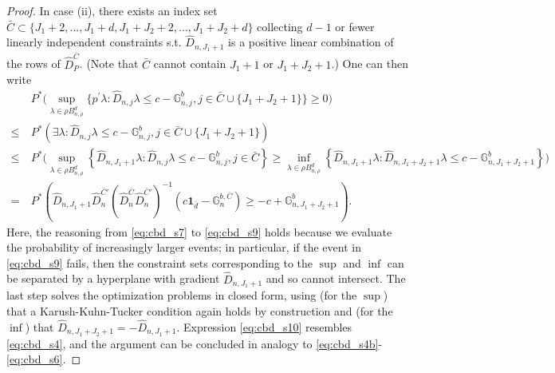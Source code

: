 \documentclass[letterpaper,11pt]{article}
\theoremstyle{myplain}
\theoremstyle{mydefinition}
\theoremstyle{myremark}
\newcommand{\G}{\mathbb{G}}
\numberwithin{equation}{section}
\numberwithin{figure}{section}
\begin{document}
\begin{appendices}
\begin{proof}
In case (ii), there exists an index set $\bar C \subset \{J_1+2,...,J_1+d,J_1+J_2+2,...,J_1+J_2+d\}$ collecting $d-1$ or fewer linearly independent constraints s.t. $\hat{D}_{n,J_1+1}$ is a positive linear combination of the rows of $\hat{D}_{P}^{\bar C}$. (Note that $\bar C$ cannot contain $J_1+1$ or $J_1+J_2+1$.) One can then write
\begin{align}
&~P^* \Big( \sup_{\lambda \in \rho B^d_{n,\rho}} \Big\{ p^{\prime }\lambda:\hat{D}_{n,j}\lambda \leq c-\G_{n,j}^b,j \in \bar C \cup \{J_1+J_2+1\} \Big\} \geq 0 \Big) \label{eq:cbd_s7}\\
\leq &~P^* \left( \exists \lambda: \hat{D}_{n,j}\lambda \leq c-\G_{n,j}^b,j \in \bar C \cup \{J_1+J_2+1\} \right) \label{eq:cbd_s8}\\
\leq &~P^* \Big(\sup_{\lambda \in \rho B^d_{n,\rho}} \left\{ \hat{D}_{n,J_1+1}\lambda: \hat{D}_{n,j}\lambda \leq c-\G_{n,j}^b,j \in \bar C \right\} \geq \inf_{\lambda \in \rho B^d_{n,\rho}} \left\{ \hat{D}_{n,J_1+1}\lambda: \hat{D}_{n,J_1+J_2+1}\lambda \leq c-\G_{n,J_1+J_2+1}^b\right\} \Big)\label{eq:cbd_s9} \\
= &~P^* \left( \hat{D}_{n,J_1+1} \hat{D}^{\bar C \prime}_{n} (\hat{D}^{\bar C}_{n} \hat{D}^{\bar C \prime}_{n})^{-1} (c\mathbf{1}_{\bar d}-\G^{b,\bar C}_n) \geq -c+\G_{n,J_1+J_2+1}^b \right). \label{eq:cbd_s10} 
\end{align}
Here, the reasoning from \eqref{eq:cbd_s7} to \eqref{eq:cbd_s9} holds because we evaluate the probability of increasingly larger events; in particular, if the event in \eqref{eq:cbd_s9} fails, then the constraint sets corresponding to the $\sup$ and $\inf$ can be separated by a hyperplane with gradient $\hat{D}_{n,J_1+1}$ and so cannot intersect. The last step solves the optimization problems in closed form, using (for the $\sup$) that a Karush-Kuhn-Tucker condition again holds by construction and (for the $\inf$) that $\hat{D}_{n,J_1+J_2+1}=-\hat{D}_{n,J_1+1}$. Expression \eqref{eq:cbd_s10} resembles \eqref{eq:cbd_s4}, and the argument can be concluded in analogy to \eqref{eq:cbd_s4b}-\eqref{eq:cbd_s6}.
\end{proof}




\end{appendices}
\end{document}
